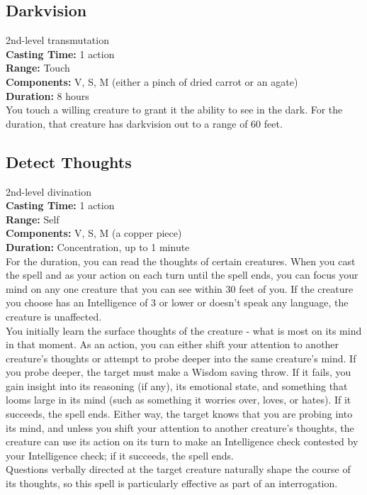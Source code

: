 \documentclass[11pt, A4paper, english]{article}
\begin{document}
		\subsection{Darkvision}
2nd-level transmutation \\
\textbf{Casting Time:} 1 action \\
\textbf{Range:} Touch \\
\textbf{Components:} V, S, M (either a pinch of dried carrot or an agate) \\
\textbf{Duration:} 8 hours \\
You touch a willing creature to grant it the ability to see in the dark. For the duration, that creature has darkvision out to a range of 60 feet.

		\subsection{Detect Thoughts}
2nd-level divination \\
\textbf{Casting Time:} 1 action \\
\textbf{Range:} Self \\
\textbf{Components:} V, S, M (a copper piece) \\
\textbf{Duration:} Concentration, up to 1 minute \\
For the duration, you can read the thoughts of certain creatures. When you cast the spell and as your action on each turn until the spell ends, you can focus your mind on any one creature that you can see within 30 feet of you. If the creature you choose has an Intelligence of 3 or lower or doesn't speak any language, the creature is unaffected. \\
You initially learn the surface thoughts of the creature - what is most on its mind in that moment. As an action, you can either shift your attention to another creature’s thoughts or attempt to probe deeper into the same creature's mind. If you probe deeper, the target must make a Wisdom saving throw. If it fails, you gain insight into its reasoning (if any), its emotional state, and something that looms large in its mind (such as something it worries over, loves, or hates). If it succeeds, the spell ends. Either way, the target knows that you are probing into its mind, and unless you shift your attention to another creature's thoughts, the creature can use its action on its turn to make an Intelligence check contested by your Intelligence check; if it succeeds, the spell ends. \\
Questions verbally directed at the target creature naturally shape the course of its thoughts, so this spell is particularly effective as part of an interrogation. \\
\end{document}

